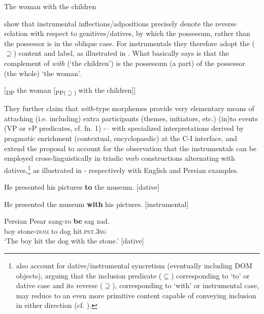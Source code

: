 \documentclass[output=paper,modfonts,nonflat,newtxmath,colorlinks,citecolor=brown]{langsci/langscibook}
\begin{document}
\ea%
    \label{ex:franco:4}
    The woman with the children
    \z        

\citet{FrancoManzini2017Ins} show that instrumental inflections/adpositions precisely denote the reverse relation with respect to genitives/datives, by which the possessum, rather than the possessor is in the oblique case. For instrumentals they therefore adopt the (${\supseteq}$) content and label, as illustrated in . What  basically says is that the complement of \textit{with} (‘the children’) is the possessum (a part) of the possessor (the whole) ‘the woman’.

\ea%
    \label{ex:franco:5}
     {[}\textsubscript{DP} the woman [\textsubscript{PP(${\supseteq}$)} with the children]{]}

    \z

          
They further claim that \textit{with}{}-type morphemes provide very elementary means of attaching (i.e. including) extra participants (themes, initiators, etc.) (in)to events (VP or vP predicates, cf. fn. 1) -– with specialized interpretations derived by pragmatic enrichment (contextual, encyclopaedic) at the C-I interface, and extend the proposal to account for the observation that the instrumentals can be employed cross-linguistically in triadic verb constructions alternating with datives,\footnote{\citet{FrancoManzini2017Ins} also account for dative/instrumental syncretism (eventually including DOM objects), arguing that the inclusion predicate (\textrm{${\subseteq}$}) corresponding to ‘to’ or dative case and its reverse (\textrm{${\supseteq}$}), corresponding to ‘with’ or instrumental case, may reduce to an even more primitive content capable of conveying inclusion in either direction (cf. ).}  as illustrated in - respectively with English and Persian examples. 

\ea%
    \label{ex:franco:6}
    \ea \label{ex:franco:6a}
    He presented his pictures \textbf{to} the museum. \hfill[dative]
    
     \ex \label{ex:franco:6b}
    He presented the museum \textbf{with} his pictures. \hfill[instrumental]
    \z
    \z


\ea Persian%
    \label{ex:franco:7}
    \ea  \label{ex:franco:7a}
    \gll  Pesar sang-ro \textbf{be} sag zad.  \\
         boy stone-\textsc{dom} to dog hit.\textsc{pst.3sg} \\
    \glt ‘The boy hit the dog with the stone.’ \hfill [dative]
    
\end{document}
